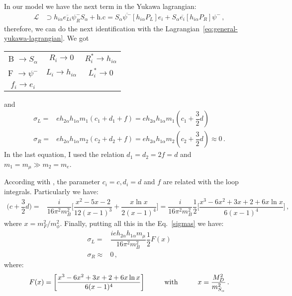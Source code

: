 In our model we have the next term in the Yukawa lagrangian:
\begin{align}
\mathcal{L}&\supset h_{i\alpha}\overline{e_{Li}}\psi^-_{R}S_\alpha+ \text{h.c} =S_\alpha\overline{\psi^-}[h_{i\alpha}P_L]e_i + S_\alpha\overline{e_i}[h_{i\alpha}P_R]\psi^- \,,
\end{align}
%
therefore, we can do the next identification with the Lagrangian~\ref{eq:general-yukawa-lagrangian}. We got
%
\begin{center}
\begin{tabular}{|c|c|c|}
\hline
B $\rightarrow S_\alpha$ & $R_i \rightarrow  0$ & $R_i^* \rightarrow  h_{i\alpha}$  \\
F $\rightarrow \psi^-$ & $L_i \rightarrow h_{i\alpha}$ & $L_i^* \rightarrow  0$ \\
$f_i \rightarrow e_{i}$ &  & \\ 
\hline
\end{tabular}
\end{center}
and
\begin{align}
\sigma_L=&eh_{2\alpha}h_{1\alpha}m_1(c_1+d_1+f)=eh_{2\alpha}h_{1\alpha}m_1(c_1+\dfrac{3}{2}d) \nonumber \\
\sigma_R=&eh_{2\alpha}h_{1\alpha}m_2(c_2+d_2+f)=eh_{2\alpha}h_{1\alpha}m_2(c_2+\dfrac{3}{2}d) \approx 0 \,.
\label{sigmas}
\end{align}
In the last equation, I used the relation $d_1=d_2=2f=d$ and $m_1=m_{\mu} \gg m_2=m_{e} $.

According with \cite{Lavoura:2003xp}, the parameter $c_i=c,d_i=d$ and $f$ are related with the loop integrals. Particularly we have:
\begin{align}
\bigg(c+\dfrac{3}{2}d\bigg)=&\dfrac{i}{16\pi^2 m_B^2}\bigg[\dfrac{x^2-5x-2}{12(x-1)^3}+\dfrac{x \ln x}{2(x-1)^4}\bigg]=\dfrac{i}{16\pi^2 m_B^2}\dfrac{1}{2}\bigg[\dfrac{x^3-6x^2+3x+2+6x\ln x}{6(x-1)^4}\bigg]\,,
\end{align}
where $x=m_F^2/m_{\phi}^2 $. 
%
Finally, putting all this in the Eq.~\eqref{sigmas} we have:
\begin{align}
\sigma_L=&\dfrac{i eh_{2\alpha}h_{1\alpha}m_{\mu}}{16\pi^2 m_B^2}\dfrac{1}{2}F(x)\nonumber \\
\sigma_R \approx & 0 \,,
\label{sigmas_result}
\end{align}
where: 
\begin{align}
F(x)=\bigg[\dfrac{x^3-6x^2+3x+2+6x\ln x}{6(x-1)^4}\bigg] \hspace{1 cm} \text{with} \hspace{1 cm} x=\dfrac{M_D^2}{m_{S_{\alpha}}^2}\,.
\label{Fx}
\end{align}

